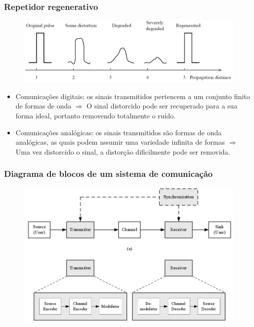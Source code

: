\begin{frame}
    \frametitle{Repetidor regenerativo}
    
    \begin{figure}[t]
	  \begin{center}
	    \includegraphics[width=0.77\columnwidth]{figs/fig05}
	  \end{center}
	\end{figure}
    \begin{itemize}
     \item Comunicações digitais: os sinais transmitidos pertencem a um conjunto finito de formas de onda $\Rightarrow$ O sinal distorcido pode ser recuperado para a sua forma ideal, portanto removendo totalmente o ruído.
      \item Comunicações analógicas: os sinais transmitidos são formas de onda analógicas, as quais podem assumir uma variedade infinita de formas $\Rightarrow$ Uma vez distorcido o sinal, a distorção dificilmente pode ser removida.
    \end{itemize}
\end{frame}

\begin{frame}
    \frametitle{Diagrama de blocos de um sistema de comunicação}
    
    \begin{figure}[t]
	  \begin{center}
	    \includegraphics[width=0.77\columnwidth]{figs/fig06}
	  \end{center}
	\end{figure}
\end{frame}


